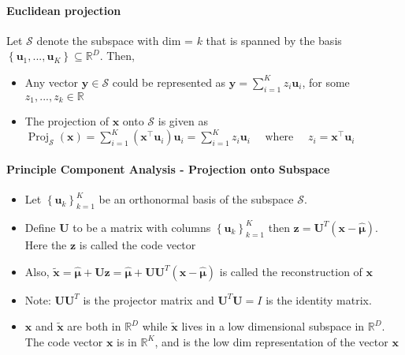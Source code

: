 \documentclass[10pt]{article}
\newcommand{\real}{\mathbb{R}}
\newcommand{\bx}{\mathbf{x}}
\newcommand{\bz}{\mathbf{z}}
\begin{document}
\paragraph{Euclidean projection} Let $\mathcal{S}$ denote the subspace with dim = $k$ that is spanned by the basis $\left\{ \mathbf{u}_1,...,\mathbf{u}_K \right\} \subseteq \real^D $. Then,
\begin{itemize}
	\setlength\itemsep{-0.45em}
	\item Any vector $\mathbf{y} \in \mathcal{S}$ could be represented as $\mathbf{y} = \sum_{i=1}^K z_i\mathbf{u}_i$, for some $z_1,...,z_k\in \real$
	\item The projection of $\mathbf{x}$ onto $\mathcal{S}$ is given as $\operatorname{Proj}_{\mathcal{S}}(\mathbf{x})= \sum_{i=1}^{K} (\mathbf{x}^{\top} \mathbf{u}_{i}) \mathbf{u}_{i} =\sum_{i=1}^{K} z_{i} \mathbf{u}_{i} \quad \text { where } \quad z_{i}=\mathbf{x}^{\top} \mathbf{u}_{i}$
\end{itemize}

\paragraph{Principle Component Analysis - Projection onto Subspace} 
\begin{itemize}
	\setlength\itemsep{-0.45em}
	\item Let $\left\{\mathbf{u}_{k}\right\}_{k=1}^{K}$ be an \color{BurntOrange}orthonormal \color{Black} basis of the subspace $\mathcal{S}$.
	\item Define $\mathbf{U}$ to be a matrix with columns $\left\{\mathbf{u}_{k}\right\}_{k=1}^{K}$ then ${\mathbf{z}=\mathbf{U}^{T}(\mathbf{x}-\hat{\boldsymbol{\mu}})}$. Here the $\bz$ is called the code vector 
	\item Also, $\tilde{\mathbf{x}}=\hat{\boldsymbol{\mu}}+\mathbf{U} \mathbf{z}=\hat{\boldsymbol{\mu}}+\mathbf{U} \mathbf{U}^{T}(\mathbf{x}-\hat{\boldsymbol{\mu}})$ is called the reconstruction of $\mathbf{x}$
	\item Note: $\mathbf{U} \mathbf{U}^{T}$ is the projector matrix and $\mathbf{U}^{T} \mathbf{U}=I$ is the identity matrix. 
	\item $\bx$ and $\tilde{\bx}$ are both in $\real^D$ while $\tilde{\bx}$ lives in a low dimensional subspace in $\real^D$. The code vector $\bx$ is in $\real^K$, and is the low dim representation of the vector $\bx$
\end{itemize}
\end{document}
